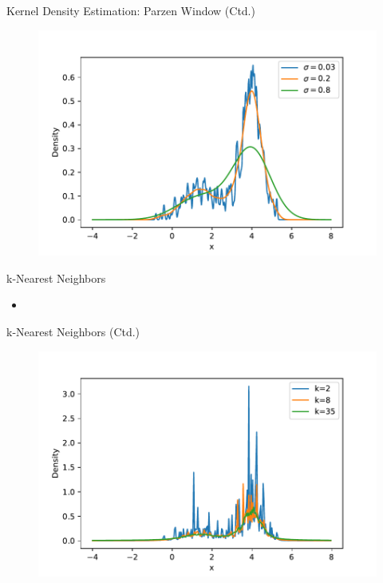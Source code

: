 \begin{frame}{Kernel Density Estimation: Parzen Window (Ctd.)}
	\begin{figure}
		\centering
		\includegraphics[scale=0.55]{04_density_estimation/02_img/kde}
	\end{figure}
\end{frame}


\begin{frame}{k-Nearest Neighbors}
	\begin{itemize}
		\item 
	\end{itemize}
\end{frame}


\begin{frame}{k-Nearest Neighbors (Ctd.)}
	\begin{figure}
		\centering
		\includegraphics[scale=0.55]{04_density_estimation/02_img/knn}
	\end{figure}
\end{frame}


